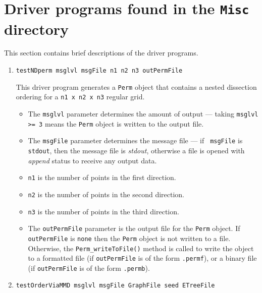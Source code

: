 \par
\section{Driver programs found in the {\tt Misc} directory}
\label{section:Misc:drivers}
\par
This section contains brief descriptions of the driver programs.
\par
\begin{enumerate}
\item
\begin{verbatim}
testNDperm msglvl msgFile n1 n2 n3 outPermFile
\end{verbatim}
This driver program generates a {\tt Perm} object that contains a
nested dissection ordering for a {\tt n1 x n2 x n3} regular grid.
\par
\begin{itemize}
\item
The {\tt msglvl} parameter determines the amount of output ---
taking {\tt msglvl >= 3} means the {\tt Perm} object is written
to the output file.
\item
The {\tt msgFile} parameter determines the message file --- if {\tt
msgFile} is {\tt stdout}, then the message file is {\it stdout},
otherwise a file is opened with {\it append} status to receive any
output data.
\item
{\tt n1} is the number of points in the first direction.
\item
{\tt n2} is the number of points in the second direction.
\item
{\tt n3} is the number of points in the third direction.
\item
The {\tt outPermFile} parameter is the output file for the {\tt Perm}
object. 
If {\tt outPermFile} is {\tt none} then the {\tt Perm} object is not
written to a file. 
Otherwise, the {\tt Perm\_writeToFile()} method is called to write
the object to 
a formatted file (if {\tt outPermFile} is of the form {\tt *.permf}),
or
a binary file (if {\tt outPermFile} is of the form {\tt *.permb}).
\end{itemize}
\item
\begin{verbatim}
testOrderViaMMD msglvl msgFile GraphFile seed ETreeFile
\end{verbatim}

\end{enumerate}
